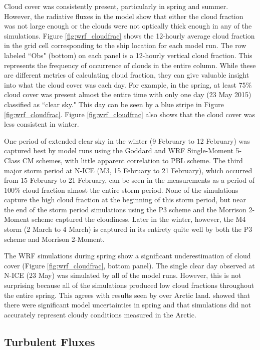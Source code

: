 Cloud cover was consistently present, particularly in spring and summer. However, the radiative fluxes in the model show that either the cloud fraction was not large enough or the clouds were not optically thick enough in any of the simulations. Figure \ref{fig:wrf_cloudfrac} shows the 12-hourly average cloud fraction in the grid cell corresponding to the ship location for each model run. The row labeled ``Obs" (bottom) on each panel is a 12-hourly vertical cloud fraction. This represents the frequency of occurrence of clouds in the entire column. While these are different metrics of calculating cloud fraction, they can give valuable insight into what the cloud cover was each day. For example, in the spring, at least 75$\%$ cloud cover was present almost the entire time with only one day (23 May 2015) classified as ``clear sky." This day can be seen by a blue stripe in Figure \ref{fig:wrf_cloudfrac}. Figure \ref{fig:wrf_cloudfrac} also shows that the cloud cover was less consistent in winter. 

One period of extended clear sky in the winter (9 February to 12 February) was captured best by model runs using the Goddard and WRF Single-Moment 5-Class CM schemes, with little apparent correlation to PBL scheme. The third major storm period at N-ICE (M3, 15 February to 21 February), which occurred from 15 February to 21 February, can be seen in the measurements as a period of 100$\%$ cloud fraction almost the entire storm period. None of the simulations capture the high cloud fraction at the beginning of this storm period, but near the end of the storm period simulations using the P3 scheme and the Morrison 2-Moment scheme captured the cloudiness. Later in the winter, however, the M4 storm (2 March to 4 March) is captured in its entirety quite well by both the P3 scheme and Morrison 2-Moment. 

The WRF simulations during spring show a significant underestimation of cloud cover (Figure \ref{fig:wrf_cloudfrac}, bottom panel). The single clear day observed at N-ICE (23 May) was simulated by all of the model runs. However, this is not surprising because all of the simulations produced low cloud fractions throughout the entire spring. This agrees with results seen by \citet{hines:2011} over Arctic land. \citet{hines:2011} showed that there were significant model uncertainties in spring and that simulations did not accurately represent cloudy conditions measured in the Arctic. 

\subsection{Turbulent Fluxes}

